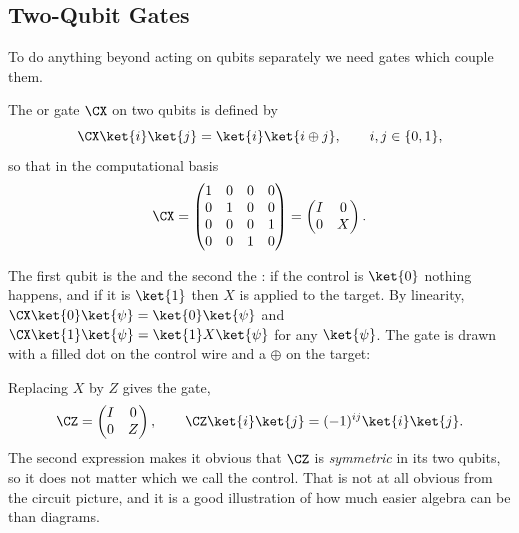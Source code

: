 \begin{center}
\end{center}

\subsection{Two-Qubit Gates}

To do anything beyond acting on qubits separately we need gates which couple them.

\begin{definition}
	The  or  gate $\CX$ on two qubits is defined by
	$$\CX\ket{i}\ket{j} = \ket{i}\ket{i\oplus j}, \qquad i,j\in\{0,1\},$$
	so that in the computational basis
	$$\CX = \begin{pmatrix} 1 & 0 & 0 & 0 \\ 0 & 1 & 0 & 0 \\ 0 & 0 & 0 & 1 \\ 0 & 0 & 1 & 0\end{pmatrix} = \begin{pmatrix} I & 0 \\ 0 & X\end{pmatrix}.$$
\end{definition}

The first qubit is the  and the second the : if the control is $\ket{0}$ nothing happens, and if it is $\ket{1}$ then $X$ is applied to the target. By linearity, $\CX\ket{0}\ket{\psi} = \ket{0}\ket{\psi}$ and $\CX\ket{1}\ket{\psi} = \ket{1}X\ket{\psi}$ for any $\ket{\psi}$. The gate is drawn with a filled dot on the control wire and a $\oplus$ on the target:

\begin{center}
\end{center}

Replacing $X$ by $Z$ gives the  gate,
$$\CZ = \begin{pmatrix} I & 0 \\ 0 & Z\end{pmatrix}, \qquad \CZ \ket{i}\ket{j} = (-1)^{ij}\ket{i}\ket{j}.$$
The second expression makes it obvious that $\CZ$ is \emph{symmetric} in its two qubits, so it does not matter which we call the control. That is not at all obvious from the circuit picture, and it is a good illustration of how much easier algebra can be than diagrams.

